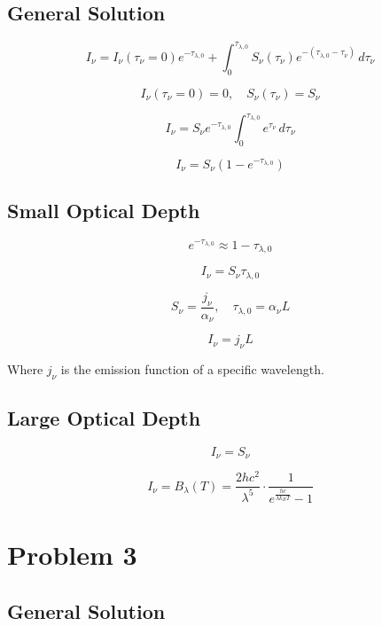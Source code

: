 \documentclass[12pt]{article}
\begin{document}
\subsection{General Solution}



\[
    I_\nu = I_\nu(\tau_\nu=0) e^{-\tau_{\lambda,0}} + \int_{0}^{\tau_{\lambda,0}} S_\nu(\tau_\nu) e^{-(\tau_{\lambda,0} - \tau_\nu)} \, d\tau_\nu
\]

\[
    I_\nu(\tau_\nu=0) = 0,\quad S_\nu(\tau_\nu) = S_\nu
\]

\[
    I_\nu = S_\nu e^{-\tau_{\lambda,0}} \int_{0}^{\tau_{\lambda,0}} e^{\tau_\nu} \, d\tau_\nu
\]

\[
    I_\nu = S_\nu (1 - e^{-\tau_{\lambda,0}})
\]

\subsection{Small Optical Depth}

\[
    e^{-\tau_{\lambda,0}} \approx 1 - \tau_{\lambda,0}
\]

\[
    I_\nu = S_\nu \tau_{\lambda,0}
\]

\[
    S_\nu = \frac{j_\nu}{\alpha_\nu},\quad \tau_{\lambda,0} = \alpha_\nu L
\]

\[
    I_\nu = j_\nu L
\]

Where $j_\nu$ is the emission function of a specific wavelength.

\subsection{Large Optical Depth}

\[
    I_\nu = S_\nu
\]

\[
    I_\nu = B_\lambda(T) = \frac{2 h c^2}{\lambda^5} \cdot \frac{1}{e^{\frac{h c}{\lambda k_B T}} - 1}
\]

\newpage

\section{Problem 3}

\subsection{General Solution}
\end{document}

